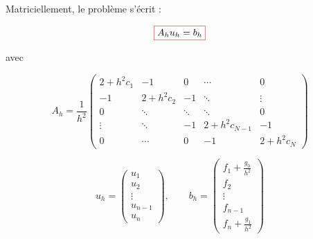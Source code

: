 \documentclass{beamer}
\newcommand{\myredbox}[1]{\fcolorbox{red}{white}{$\displaystyle#1$}}
\begin{document}
\begin{frame} 

 Matriciellement, le problème s'écrit : 
 
 \begin{equation}
 \myredbox{A_h u_h =b_h}
 \end{equation}
 
  avec
 
 
 
 \[A_h=\frac{1}{h^2}
\left(\begin{array}{ccccc}
2+h^2c_1&-1&0&\cdots&0\\
-1&2+h^2c_2&-1&\ddots&\vdots\\
0&  \ddots &\ddots&\ddots&0\\
\vdots &\ddots &-1&2+h^2c_{N-1}&-1\\
   0&\cdots &0&-1 &2+h^2c_N
\end{array}\right)
\] 
 

\[u_h =\left(\begin{array}{c}
u_1\\u_2\\ \vdots \\ u_{n-1} \\ u_n
\end{array}\right), \qquad b_h =\left(\begin{array}{c}
f_1+\frac{g_0}{h^2}\\f_2\\ \vdots \\ f_{n-1} \\ f_n+\frac{g_1}{h^2}
\end{array}\right)
\]

\end{frame}
 
 
 
\end{document}
